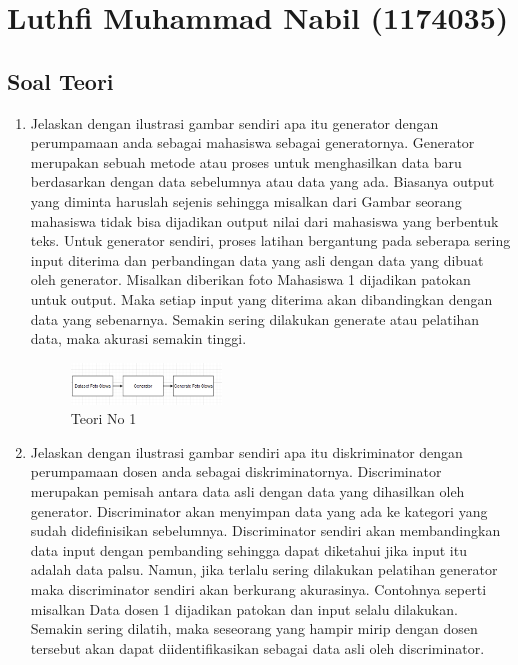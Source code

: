 \section{Luthfi Muhammad Nabil (1174035)}
\subsection{Soal Teori}
\begin{enumerate}
    \item
    Jelaskan dengan ilustrasi gambar sendiri apa itu generator dengan perumpamaan anda sebagai mahasiswa sebagai generatornya.\hfill \break
    Generator merupakan sebuah metode atau proses untuk menghasilkan data baru berdasarkan dengan data sebelumnya atau data yang ada. Biasanya output yang diminta haruslah sejenis sehingga misalkan dari Gambar seorang mahasiswa tidak bisa dijadikan output nilai dari mahasiswa yang berbentuk teks. Untuk generator sendiri, proses latihan bergantung pada seberapa sering input diterima dan perbandingan data yang asli dengan data yang dibuat oleh generator. Misalkan diberikan foto Mahasiswa 1 dijadikan patokan untuk output. Maka setiap input yang diterima akan dibandingkan dengan data yang sebenarnya. Semakin sering dilakukan generate atau pelatihan data, maka akurasi semakin tinggi. 
    \begin{figure}[H]
        \includegraphics[width=4cm]{figures/1174035/chapter8/teori1.png}
        \centering
          \caption{Teori No 1}
    \end{figure}
    \item
    Jelaskan dengan ilustrasi gambar sendiri apa itu diskriminator dengan perumpamaan dosen anda sebagai diskriminatornya.\hfill \break
    Discriminator merupakan pemisah antara data asli dengan data yang dihasilkan oleh generator. Discriminator akan menyimpan data yang ada ke kategori yang sudah didefinisikan sebelumnya. Discriminator sendiri akan membandingkan data input dengan pembanding sehingga dapat diketahui jika input itu adalah data palsu. Namun, jika terlalu sering dilakukan pelatihan generator maka discriminator sendiri akan berkurang akurasinya. Contohnya seperti misalkan Data dosen 1 dijadikan patokan dan input selalu dilakukan. Semakin sering dilatih, maka seseorang yang hampir mirip dengan dosen tersebut akan dapat diidentifikasikan sebagai data asli oleh discriminator. 
    \begin{figure}[H]

\end{figure}
\end{enumerate}
